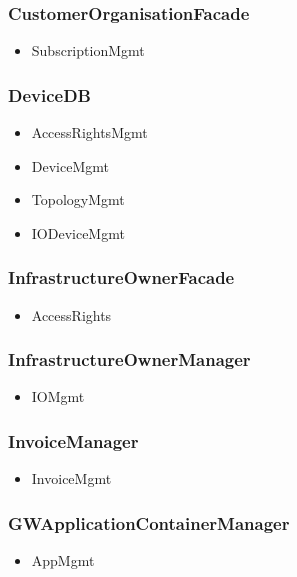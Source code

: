     \subsubsection{CustomerOrganisationFacade}
        \begin{itemize}
            \item SubscriptionMgmt
        \end{itemize}

    \subsubsection{DeviceDB}
        \begin{itemize}
            \item AccessRightsMgmt
            \item DeviceMgmt
            \item TopologyMgmt
            \item IODeviceMgmt
        \end{itemize}

    \subsubsection{InfrastructureOwnerFacade}
        \begin{itemize}
            \item AccessRights
        \end{itemize}

    \subsubsection{InfrastructureOwnerManager}
        \begin{itemize}
            \item IOMgmt
        \end{itemize}

    \subsubsection{InvoiceManager}
        \begin{itemize}
            \item InvoiceMgmt
        \end{itemize}

    \subsubsection{GWApplicationContainerManager}
        \begin{itemize}
            \item AppMgmt
        \end{itemize}

